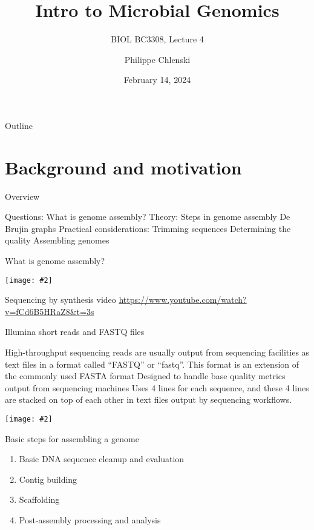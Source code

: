 \documentclass{beamer}
\title{Intro to Microbial Genomics}
\subtitle{BIOL BC3308, Lecture 4}
\author{Philippe Chlenski}
\date{February 14, 2024}
\renewcommand{\c}[1]{\begin{center}#1\end{center}}
\newcommand{\gr}[2][.95]{\c{\texttt{[image: \#2]}}}
\begin{document}
\begin{frame}[plain]
\titlepage
\end{frame}

\begin{frame}{Outline}
\tableofcontents
\end{frame}

\section{Background and motivation}

\begin{frame}{Overview}
\begin{outline}
\1[] Questions:
    \2 What is genome assembly?
\1[] Theory:
    \2 Steps in genome assembly
    \2 De Brujin graphs
\1[] Practical considerations:
    \2 Trimming sequences
    \2 Determining the quality
    \2 Assembling genomes
\end{outline}
\end{frame}

\begin{frame}{What is genome assembly?}
\gr{l4_figs/s3_intro.png}
\end{frame}

\begin{frame}{Sequencing by synthesis video}
\url{https://www.youtube.com/watch?v=fCd6B5HRaZ8&t=3s}
\end{frame}

\begin{frame}{Illumina short reads and FASTQ files}
\begin{outline}
    \1[] High-throughput sequencing reads are usually output from sequencing facilities as text files in a format called “FASTQ” or “fastq”. 
    \1[] This format is an extension of the commonly used FASTA format
    \1[] Designed to handle base quality metrics output from sequencing machines
    \1[] Uses 4 lines for each sequence, and these 4 lines are stacked on top of each other in text files output by sequencing workflows.
\end{outline}
\gr{l4_figs/s5_read.png}
\end{frame}

\begin{frame}{Basic steps for assembling a genome}
\begin{enumerate}
    \item Basic DNA sequence cleanup and evaluation
    \item Contig building
    \item Scaffolding
    \item Post-assembly processing and analysis
\end{enumerate}
\end{frame}
\end{document}
